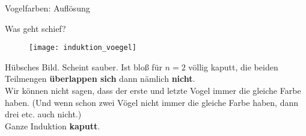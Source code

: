 \begin{frame}[t]{Vogelfarben: Auflösung}
	\begin{block}{Was geht schief?}
		\begin{figure}
			\texttt{[image: induktion\_voegel]}
			\centering
		\end{figure}
		\pause
		Hübsches Bild. Scheint sauber. Ist bloß für $n=2$ völlig kaputt, die beiden Teilmengen \textbf{überlappen sich} dann nämlich \textbf{nicht}. \\
		\impl Wir können nicht sagen, dass der erste und letzte Vogel immer die gleiche Farbe haben. (Und wenn schon zwei Vögel nicht immer die gleiche Farbe haben, dann drei etc. auch nicht.) \\
		\impl Ganze Induktion \textbf{kaputt}. \frownie
	\end{block}	
\end{frame}